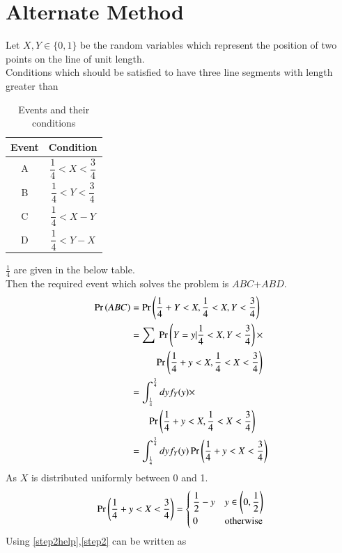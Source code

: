 \documentclass[journal,12pt,twocolumn]{IEEEtran}
\begin{document}
\section{Alternate Method}
 Let $X,Y \in \{0,1\}$ be the random variables which represent the position of two points on the line of unit length.\\
Conditions which should be satisfied to have three line segments with length greater than 
\begin{table}[h]
\centering
\bgroup
\def\arraystretch{2}
\begin{tabular}{|c|c|}
\hline
\textbf{Event} & \textbf{Condition}                     \\\hline
A              & $\dfrac{1}{4}<X<\dfrac{3}{4}$ \\[1ex] \hline
B              & $\dfrac{1}{4}<Y<\dfrac{3}{4}$ \\[1ex] \hline
C              & $\dfrac{1}{4}<X-Y$ \\[1ex] \hline
D           & $\dfrac{1}{4}<Y-X$ \\[1ex] \hline
\end{tabular}
\egroup
\caption{Events and their conditions}
\label{tab:Events}
\end{table}
$\frac{1}{4}$ are given in the below table.\\
Then the required event which solves the problem is $ABC$+$ABD$.
\begin{align}
    \Pr\left(ABC\right)&=\Pr\left(\frac{1}{4}+Y<X,\frac{1}{4}<X,Y<\frac{3}{4}\right)\\
    &=\sum~\Pr\left(Y=y|\frac{1}{4}<X,Y<\frac{3}{4}\right)\times\nonumber\\
    &~~~~~~~~~~\Pr\left(\frac{1}{4}+y<X,\frac{1}{4}<X<\frac{3}{4}\right)\\
    &=\int_{\frac{1}{4}}^{\frac{3}{4}}dyf_Y(y)\times\nonumber\\ &~~~~~~~\Pr\left(\frac{1}{4}+y<X,\frac{1}{4}<X<\frac{3}{4}\right)\\
     &=\int_{\frac{1}{4}}^{\frac{3}{4}}dyf_Y(y)\Pr\left(\frac{1}{4}+y<X<\frac{3}{4}\right)\label{step2}
     \end{align}
     As $X$ is distributed uniformly between 0 and 1.
     \begin{align}
        \Pr\left(\frac{1}{4}+y<X<\frac{3}{4}\right)=\begin{cases}
        \dfrac{1}{2}-y&y\in \left(0,\dfrac{1}{2}\right)\\
        0&\text{otherwise}
        \end{cases}\label{step2help}
     \end{align}
     Using \eqref{step2help},\eqref{step2} can be written as
\end{document}
